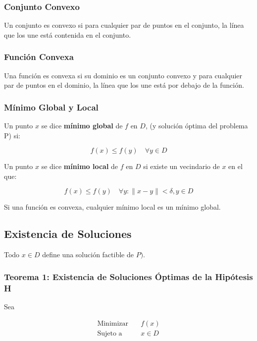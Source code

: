 \documentclass{article}
\begin{document}
\subsubsection{Conjunto Convexo}

Un conjunto es convexo si para cualquier par de puntos en el conjunto, la línea que los une está contenida en el conjunto.

\subsubsection{Función Convexa}

Una función es convexa si su dominio es un conjunto convexo y para cualquier par de puntos en el dominio, la línea que los une está por debajo de la función.

\subsubsection{Mínimo Global y Local}

Un punto $x$ se dice \textbf{mínimo global} de $f$ en $D$, (y solución óptima del problema P) si:

\begin{equation*}
    f(x) \leq f(y) \quad \forall y \in D
\end{equation*}

Un punto $x$ se dice \textbf{mínimo local} de $f$ en $D$ si existe un vecindario de $x$ en el que:

\begin{equation*}
    f(x) \leq f(y) \quad \forall y: \lVert x - y \rVert < \delta, y \in D
\end{equation*}

Si una función es convexa, cualquier mínimo local es un mínimo global.

\subsection{Existencia de Soluciones}

Todo $x \in D$ define una solución factible de $P)$. 

\subsubsection{Teorema 1: Existencia de Soluciones Óptimas de la Hipótesis H}

Sea

\begin{align*}
    \text{Minimizar} \quad & f(x) \\
    \text{Sujeto a} \quad & x \in D
\end{align*}
\end{document}
